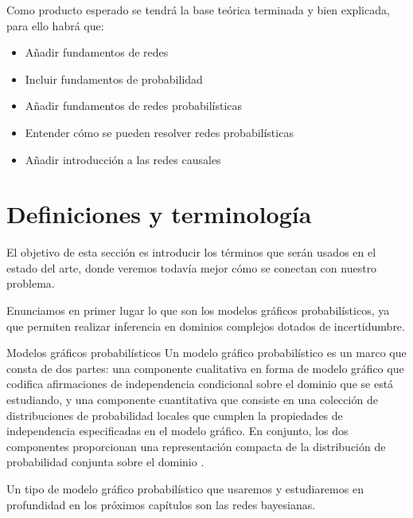 Como producto esperado se tendrá la base teórica terminada y bien explicada, para ello habrá que: 

\begin{itemize}
    \item Añadir fundamentos de redes
    \item Incluir fundamentos de probabilidad 
    \item Añadir fundamentos de redes probabilísticas 
    \item Entender cómo se pueden resolver redes probabilísticas 
    \item Añadir introducción a las redes causales 
\end{itemize}

\section{Definiciones y terminología}
El objetivo de esta sección es introducir los términos que serán usados en el estado del arte, donde veremos 
todavía mejor cómo se conectan con nuestro problema.

Enunciamos en primer lugar lo que son los modelos gráficos probabilísticos, ya que permiten realizar 
inferencia en dominios complejos dotados de incertidumbre.

\begin{definicion}{Modelos gráficos probabilísticos} \label{subsect:modelos}
Un modelo gráfico probabilístico es un marco que consta de dos partes: una componente cualitativa
en forma de modelo gráfico que codifica afirmaciones de independencia condicional sobre el 
dominio que se está estudiando, y una componente cuantitativa que consiste en una colección de 
distribuciones de probabilidad locales que cumplen la propiedades de independencia especificadas 
en el modelo gráfico. En conjunto, los dos componentes proporcionan una representación compacta de la 
distribución de probabilidad conjunta sobre el dominio \cite{inference-rev-hbn}. 
\end{definicion}

Un tipo de modelo gráfico probabilístico que usaremos y estudiaremos en profundidad en los próximos 
capítulos son las redes bayesianas.

